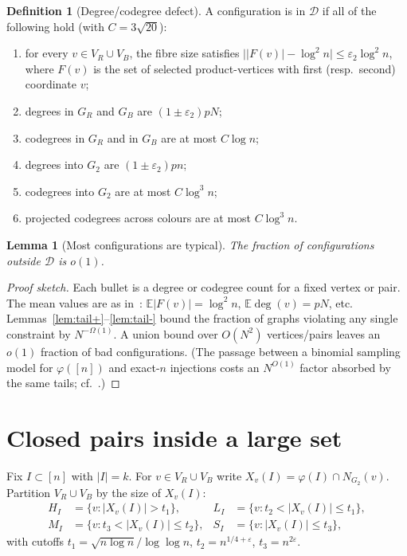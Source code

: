\documentclass[11pt]{article}
\newtheorem{lemma}[theorem]{Lemma}
\theoremstyle{definition}
\newtheorem{definition}[theorem]{Definition}
\newcommand{\cD}{\mathcal{D}}
\newcommand{\eps}{\varepsilon}
\begin{document}
\begin{definition}[Degree/codegree defect]\label{def:D}
A configuration is in $\cD$ if all of the following hold (with $C=3\sqrt{20}$):
\begin{enumerate}
  \item for every $v\in V_{R}\cup V_{B}$, the fibre size satisfies
    $\bigl||F(v)|-\log^{2}n\bigr|\le\eps_{2}\log^{2}n$,
    where $F(v)$ is the set of selected product-vertices with first (resp.\ second) coordinate $v$;
  \item degrees in $G_{R}$ and $G_{B}$ are $(1\pm\eps_{2})pN$;
  \item codegrees in $G_{R}$ and in $G_{B}$ are at most $C\log n$;
  \item degrees into $G_{2}$ are $(1\pm\eps_{2})pn$;
  \item codegrees into $G_{2}$ are at most $C\log^{3}n$;
  \item projected codegrees across colours are at most $C\log^{3}n$.
\end{enumerate}
\end{definition}

\begin{lemma}[Most configurations are typical]\label{lem:D}
The fraction of configurations outside $\cD$ is $o(1)$.
\end{lemma}

\begin{proof}[Proof sketch]
Each bullet is a degree or codegree count for a fixed vertex or pair.
The mean values are as in~\cite{HHKP2025}: $\mathbb{E}|F(v)|=\log^{2}n$, $\mathbb{E}\deg(v)=pN$, etc.
Lemmas~\ref{lem:tail+}--\ref{lem:tail-} bound the fraction of graphs violating any single constraint by $N^{-\Omega(1)}$.
A union bound over $O(N^{2})$ vertices/pairs leaves an $o(1)$ fraction of bad configurations.
(The passage between a binomial sampling model for $\varphi([n])$ and exact-$n$ injections costs an $N^{O(1)}$ factor absorbed by the same tails; cf.~\cite[Lemma~3.1]{HHKP2025}.)
\end{proof}

\section{Closed pairs inside a large set}

Fix $I\subset[n]$ with $|I|=k$.
For $v\in V_{R}\cup V_{B}$ write $X_{v}(I)=\varphi(I)\cap N_{G_{2}}(v)$.
Partition $V_{R}\cup V_{B}$ by the size of $X_{v}(I)$:
\begin{align*}
  H_{I} &= \{v:|X_{v}(I)|>t_{1}\},
  &
  L_{I} &= \{v:t_{2}<|X_{v}(I)|\le t_{1}\},\\
  M_{I} &= \{v:t_{3}<|X_{v}(I)|\le t_{2}\},
  &
  S_{I} &= \{v:|X_{v}(I)|\le t_{3}\},
\end{align*}
with cutoffs $t_{1}=\sqrt{n\log n}/\log\log n$, $t_{2}=n^{1/4+\eps}$, $t_{3}=n^{2\eps}$.
\end{document}

